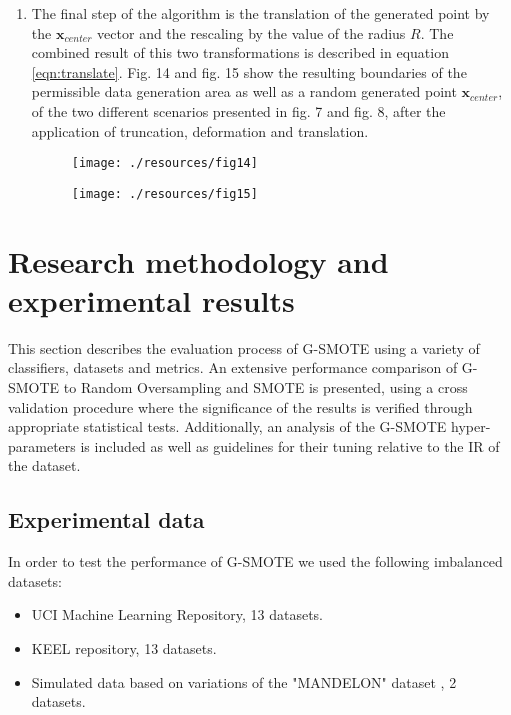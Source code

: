 \documentclass[parskip=full]{scrartcl}
\begin{document}
\begin{enumerate}
	\item The final step of the algorithm is the translation of the generated
	point by the \( \textbf{x}_{center} \) vector and the rescaling by the value
	of the radius \( R \). The combined result of this two transformations is
	described in equation \eqref{eqn:translate}. Fig. 14 and fig. 15 show the
	resulting boundaries of the permissible data generation area as well as a
	random generated point \( \textbf{x}_{center} \), of the two different
	scenarios presented in fig. 7 and fig. 8, after the application of
	truncation, deformation and translation.

	\begin{figure}[H]
		\centering
		\texttt{[image: ./resources/fig14]}
	\end{figure}
	
	\begin{figure}[H]
		\centering
		\texttt{[image: ./resources/fig15]}
	\end{figure}

\end{enumerate}

\section{Research methodology and experimental results}

This section describes the evaluation process of G-SMOTE using a variety of
classifiers, datasets and metrics. An extensive performance comparison of
G-SMOTE to Random Oversampling and SMOTE is presented, using a cross validation
procedure where the significance of the results is verified through appropriate
statistical tests. Additionally, an analysis of the G-SMOTE hyper-parameters is
included as well as guidelines for their tuning relative to the IR of the
dataset.

\subsection{Experimental data}

In order to test the performance of G-SMOTE we used the following imbalanced
datasets:

\begin{itemize}
	
	\renewcommand\labelitemi{--}

	\item UCI Machine Learning Repository, 13 datasets.

	\item KEEL repository, 13 datasets.

	\item Simulated data based on variations of the "MANDELON" dataset
	\cite{Guyon2003}, 2 datasets.

\end{itemize}
\end{document}
